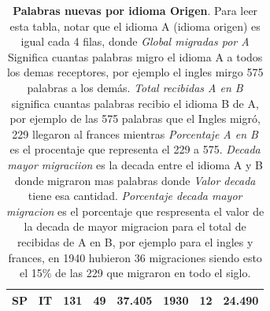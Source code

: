 \documentclass[10pt,letterpaper]{article} %
\begin{document}
\begin{table}
\begin{tabular}{cccccccc}
		SP &       IT &                    131 &                      49 &             37.405 &                    1930 &                            12 &                             24.490 \\
		\bottomrule
	\end{tabular}
	\caption{\textbf{Palabras nuevas por idioma Origen}. Para leer esta tabla, notar que el idioma A (idioma origen) es igual cada 4 filas, donde \textit{Global migradas por A} Significa cuantas palabras migro el idioma A a todos los demas receptores, por ejemplo el ingles mirgo 575 palabras a los demás. \textit{Total recibidas A en B} significa cuantas palabras recibio el idioma B de A, por ejemplo de las 575 palabras que el Ingles migró, 229 llegaron al frances mientras  \textit{Porcentaje A en B} es el procentaje que representa el 229 a 575. \textit{Decada mayor migraciion} es la decada entre el idioma A y B donde migraron mas palabras donde \textit{Valor decada} tiene esa cantidad. \textit{Porcentaje decada mayor migracion} es el porcentaje que respresenta el valor de la decada de mayor migracion para el total de recibidas de A en B, por ejemplo para el ingles y frances, en 1940 hubieron 36 migraciones siendo esto el 15\% de las 229 que migraron en todo el siglo.}
	\label{tab.opcional:new_wordsA}
\end{table}
\end{document}
